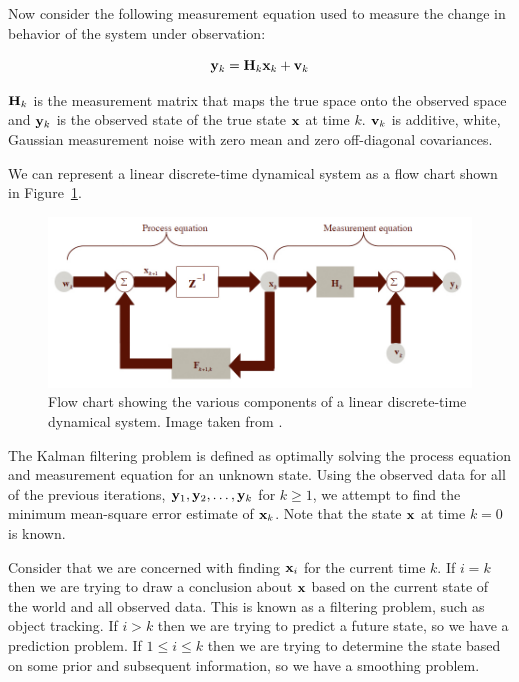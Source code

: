 \documentclass[11pt]{article}
\begin{document}
Now consider the following measurement equation used to measure the change in behavior of the system under observation:

\begin{equation}
{\bf y}_{k} = {\bf H}_{k} {\bf x}_k + {\bf v}_k
\label{eq:measure}
\end{equation}
\vspace{0.01cm}

${\bf H}_{k}$ is the measurement matrix that maps the true space onto the observed space and ${\bf y}_{k}$ is the observed state of the true state ${\bf x}$ at time $k$. ${\bf v}_k$ is additive, white, Gaussian measurement noise with zero mean and zero off-diagonal covariances.  

We can represent a linear discrete-time dynamical system as a flow chart shown in \mbox{Figure \ref{fig:kalmanflow}}.

 \begin{figure}[H]
\centering
\includegraphics[scale=.4]{img/KalmanFlow.jpg}
\caption{Flow chart showing the various components of a linear discrete-time dynamical system. Image taken from \cite{kalman}.}
\label{fig:kalmanflow}
\end{figure}

The Kalman filtering problem is defined as optimally solving the process equation and measurement equation for an unknown state. Using the observed data for all of the previous iterations, ${\bf y}_1, {\bf y}_2, \dots, {\bf y}_k$ for $k \geq 1$, we attempt to find the minimum mean-square error estimate of ${\bf x}_k$. Note that the state ${\bf x}$ at time $k = 0$ is known. 

Consider that we are concerned with finding ${\bf x}_i$ for the current time $k$. If $i = k$ then we are trying to draw a conclusion about ${\bf x}$ based on the current state of the world and all observed data. This is known as a filtering problem, such as object tracking. If $i > k$ then we are trying to predict a future state, so we have a prediction problem. If $1 \leq i \leq k$ then we are trying to determine the state based on some prior and subsequent information, so we have a smoothing problem.
\end{document}
